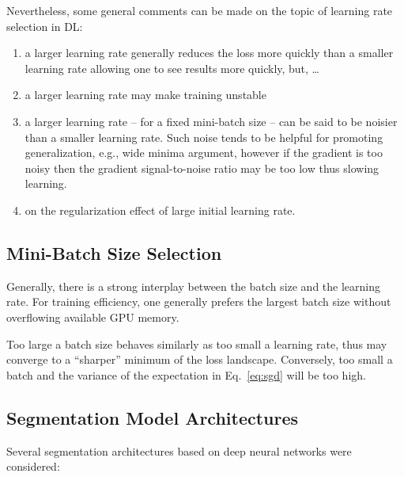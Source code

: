 \documentclass[11pt]{article} %
\begin{document}
Nevertheless, some general comments can be made on the topic of learning rate 
selection in DL: 

\begin{enumerate}
\item a larger learning rate generally reduces the loss more quickly than a
smaller learning rate allowing one to see results more quickly, but, \dots
\item a larger learning rate may make training unstable
\item a larger learning rate -- for a fixed mini-batch size -- can be said to
be noisier than a smaller learning rate. Such noise tends to be helpful for 
promoting generalization, e.g., wide minima argument, however if the gradient 
is too noisy then the gradient signal-to-noise ratio may be too low thus 
slowing learning.
\item on the regularization effect of large initial learning rate.
\end{enumerate}

\subsection{Mini-Batch Size Selection}

Generally, there is a strong interplay between the batch size and the learning
rate. For training efficiency, one generally prefers the largest batch size
without overflowing available GPU memory.

Too large a batch size behaves similarly as too small a learning rate, thus may 
converge to a ``sharper'' minimum of the loss landscape. Conversely, too small 
a batch and the variance of the expectation in Eq.~\eqref{eq:sgd} will be too 
high.

\subsection{Segmentation Model Architectures}

Several segmentation architectures based on deep neural networks were
considered: 
\end{document}
